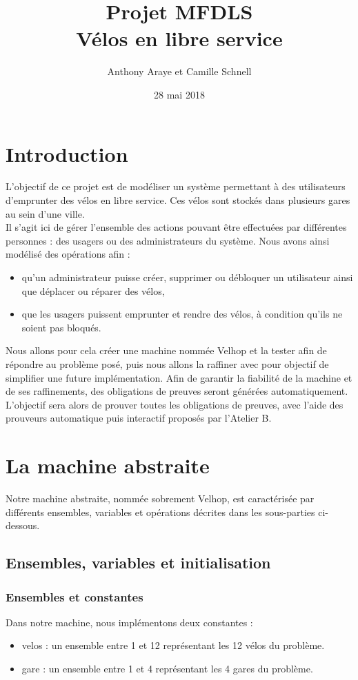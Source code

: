 \documentclass[12pt]{article}
\title{Projet MFDLS \\ Vélos en libre service}
\author{Anthony Araye et Camille Schnell}
\date{28 mai 2018}
\begin{document}
\maketitle
\newpage
\renewcommand{\contentsname}{Sommaire}
\tableofcontents
\newpage
\section{Introduction}
L'objectif de ce projet est de modéliser un système permettant à des utilisateurs d'emprunter des vélos en libre service. Ces vélos sont stockés dans plusieurs gares au sein d'une ville. \\

Il s'agit ici de gérer l'ensemble des actions pouvant être effectuées par différentes personnes : des usagers ou des administrateurs du système. Nous avons ainsi modélisé des opérations afin :
\begin{itemize}
  \item qu'un administrateur puisse créer, supprimer ou débloquer un utilisateur ainsi que déplacer ou réparer des vélos,
  \item que les usagers puissent emprunter et rendre des vélos, à condition qu'ils ne soient pas bloqués.
\end{itemize}

Nous allons pour cela créer une machine nommée Velhop et la tester afin de répondre au problème posé, puis nous allons la raffiner avec pour objectif de simplifier une future implémentation. Afin de garantir la fiabilité de la machine et de ses raffinements, des obligations de preuves seront générées automatiquement. L'objectif sera alors de prouver toutes les obligations de preuves, avec l'aide des prouveurs automatique puis interactif proposés par l'Atelier B.\\
\newpage
\section{La machine abstraite}
Notre machine abstraite, nommée sobrement Velhop, est caractérisée par différents ensembles, variables et opérations décrites dans les sous-parties ci-dessous.
\subsection{Ensembles, variables et initialisation}
\subsubsection{Ensembles et constantes}
Dans notre machine, nous implémentons deux constantes :
\begin{itemize}
  \item velos : un ensemble entre 1 et 12 représentant les 12 vélos du problème.
  \item gare : un ensemble entre 1 et 4 représentant les 4 gares du problème.
\end{itemize}
\end{document}
